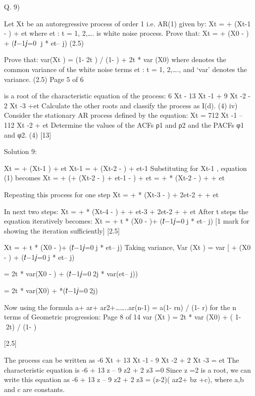Q. 9)
\item  Let Xt be an autoregressive process of order 1 i.e. AR(1) given by:
Xt = \mu + \alpha (Xt-1 - \mu) + et
where {et : t = 1, 2,….} is white noise process.
Prove that:
Xt = \mu + \alphat * (X0 - \mu) + \Sum(𝑡−1𝑗=0 j * et– j)
(2.5)
\item   Prove that:
var(Xt ) =  (1- \alpha2t ) / (1- ) + \alpha 2t * var (X0)
where  denotes the common variance of the white noise terms {et : t = 1, 2,….}, and ‘var’ denotes the variance.
(2.5)
Page 5 of 6
\item   {} is a root of the characteristic equation of the process:
6 Xt - 13 Xt -1 + 9 Xt -2 - 2 Xt -3 +et
Calculate the other roots and classify the process as I(d).
(4)
iv) Consider the stationary AR process defined by the equation:
Xt = 712 Xt -1 – 112 Xt -2 + et
Determine the values of the ACFs ρ1 and ρ2 and the PACFs φ1 and φ2.
(4)
[13]


Solution 9:
\item 
Xt = \mu + \alpha (Xt-1 \mu) + et
Xt-1 = \mu + \alpha (Xt-2 - \mu) + et-1
Substituting for Xt-1 , equation (1) becomes
Xt = \mu + \alpha (\mu + \alpha (Xt-2 - \mu) + et-1 - \mu) + et
= \mu +  * (Xt-2 - \mu) +  + et

Repeating this process for one step
Xt = \mu +  * (Xt-3 - \mu) + \alpha2et-2 +  + et

In next two steps:
Xt = \mu + * (Xt-4 - \mu) + +  et-3 + \alpha2et-2 +  + et
After t steps the equation iteratively becomes:
Xt = \mu + \alpha t * (X0 - \mu)+ \Sum(𝑡−1𝑗=0j * et– j)
[1 mark for showing the iteration sufficiently]
[2.5]
\item  
Xt = \mu + \alpha t * (X0 - \mu)+ \Sum(𝑡−1𝑗=0j * et– j)
Taking variance,
Var (Xt ) = var [ \mu + \alphat * (X0 - \mu) + \Sum(𝑡−1𝑗=0j * et– j)

= \alpha2t * var(X0 - \mu) + \Sum(𝑡−1𝑗=02j * var(et– j))

= \alpha2t * var(X0) +  *\Sum(𝑡−1𝑗=02j)

Now using the formula a+ ar+ ar2+……..ar(n-1) = a(1- rn) / (1- r) for the n terms of Geometric progression:
Page 8 of 14
var (Xt ) = \alpha2t * var (X0) +  ( 1- 2t) / (1-  )

[2.5]
\item  
The process can be written as
-6 Xt + 13 Xt -1 - 9 Xt -2 + 2 Xt -3 = et
The characteristic equation is
-6 + 13 z – 9 z2 + 2 z3 =0
Since z =2 is a root, we can write this equation as
-6 + 13 z – 9 z2 + 2 z3 = (z-2)( az2+ bz +c), where a,b and c are constants.

